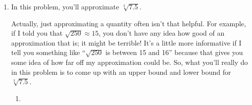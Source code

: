 \documentclass{article}
\begin{document}
\begin{enumerate}
\begin{enumerate}
    \begin{problem}[\vfill]
      Remember our goal is a formula for $Q'(x)$. Your answer to
      \ref{quotient-rule-step1} should be an equation involving
      $Q'(x)$, so solve it for $Q'(x)$. 
    \end{problem}

    \begin{solution}
      Our equation becomes: $$Q'(x)g(x) = f'(x) - Q(x)g'(x)$$ $$\fbox{$Q'(x) =\displaystyle \displaystyle\frac{f'(x)-Q(x)g'(x)}{g(x)}$}$$
    \end{solution}

  \item

    \begin{problem}[\nstretch{2}]
      We really want to express $Q'(x)$ in terms of just
      $f(x), f'(x), g(x), g'(x)$. Do this, and simplify your answer until it looks like the Quotient Rule. 
    \end{problem}

    \begin{solution}
      Since $Q(x) = \dfrac{f(x)}{g(x)}$, our previous expression
      becomes
      $Q'(x) = \displaystyle\frac{f'(x) -
        \displaystyle\frac{f(x)}{g(x)}g'(x)}{g(x)}$.

      Let's multiply by $\dfrac{g(x)}{g(x)}$ to deal with the
      fractions in the numerator:
      $$Q'(x) = \displaystyle\frac{g(x)}{g(x)} \cdot
      \displaystyle\frac{f'(x) -
        \displaystyle\frac{f(x)}{g(x)}g'(x)}{g(x)} =
      \fbox{$\displaystyle\frac{g(x)f'(x)-f(x)g'(x)}{g(x)^2}$}$$
    \end{solution}
  \end{enumerate}

\item \label{approximate-cube-root-of-7.5}

  In this problem, you'll approximate $\sqrt[3]{7.5}$.

  Actually, just approximating a quantity often isn't that helpful. For example, if I told you that $\sqrt{250} \approx 15$, you don't have any idea how good of an approximation that is; it might be terrible! It's a little more informative if I tell you something like ``$\sqrt{250}$ is between 15 and 16'' because that gives you some idea of how far off my approximation could be. So, what you'll really do in this problem is to come up with an upper bound and lower bound for $\sqrt[3]{7.5}$.

  \begin{enumerate}
  \item \label{approximate-cube-root-using-tangent-line}


\end{enumerate}
\end{enumerate}
\end{document}
